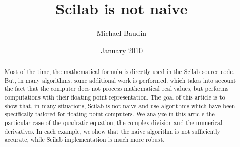 \documentclass[12pt]{article}
\begin{document}
\author{Michael Baudin}
\date{January 2010}
\title{Scilab is not naive}
\maketitle
\begin{abstract}
Most of the time, the mathematical formula is directly used in the 
Scilab source code. But, in many algorithms, some additional work is 
performed, which takes into account the fact that the computer does not 
process mathematical real values, but performs computations with their 
floating point representation. The goal of this article is to show that, 
in many situations, Scilab is not naive and use algorithms which have been 
specifically tailored for floating point computers. We analyze in this 
article the particular case of the quadratic equation, the complex 
division and the numerical derivatives. In each example, we show that 
the naive algorithm is not sufficiently accurate, while Scilab 
implementation is much more robust. 
\end{abstract}

\tableofcontents










%






\printindex
\end{document}
